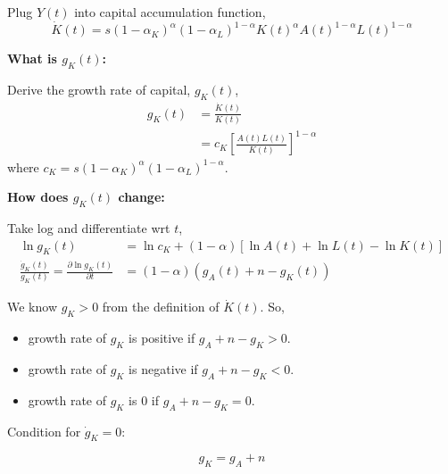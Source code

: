 \documentclass[12pt]{article}
\begin{document}
Plug $ Y(t) $ into capital accumulation function,
\begin{equation*}
\dot{K}(t) = s(1 - \alpha_{K})^{\alpha}(1 - \alpha_{L})^{1 - \alpha}
K(t)^{\alpha}A(t)^{1 - \alpha}L(t)^{1 - \alpha}
\end{equation*}

{\textbf {What is $ g_{K}(t) $:}\

Derive the growth rate of capital, $ g_{K}(t) $,
\begin{align*}
g_{K}(t)&= \frac{\dot{K}(t)}{K(t)}\\
&= c_{K}
\left[ \frac{A(t)L(t)}{K(t)}\right] ^{1 - \alpha}
\end{align*}
where $ c_{K} = s(1 - \alpha_{K})^{\alpha}(1 - \alpha_{L})^{1 - \alpha} $.


{\textbf {How does $ g_{K}(t) $ change:}}

Take log and differentiate wrt $ t $,
\begin{align*}
		\ln g_{K}(t) &= \ln c_{K} + (1 - \alpha)[\ln A(t) + \ln L(t) - \ln K(t)]\\
\frac{\dot{g}_{K}(t)}{g_{K}(t)} = \frac{\partial \ln g_{K}(t) }{\partial t }
&= (1 - \alpha)(g_{A}(t) + n - g_{K}(t))
\end{align*}

We know $ g_{K} > 0 $ from the definition of $ \dot{K}(t) $.
So,

\begin{itemize}
\item growth rate of $ g_{K} $ is positive if $ g_{A} + n - g_{K} > 0 $.
\item growth rate of $ g_{K} $ is negative if $ g_{A} + n - g_{K} < 0 $.
\item growth rate of $ g_{K} $ is 0 if $ g_{A} + n - g_{K} = 0 $.
\end{itemize}


Condition for $ \dot{g}_{K} = 0 $:

\begin{equation*}
g_{K} = g_{A} + n
\end{equation*}

\begin{figure}[H]
\end{figure}


}
\end{document}
